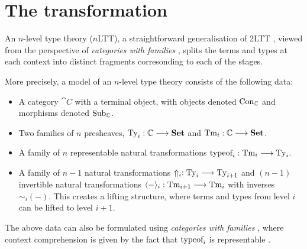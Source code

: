 \section{The transformation}\label{sec:prelim}

An $n$-level type theory ($n$LTT), a straightforward generalisation of 2LTT
\cite{Kovacs2022-vb}, viewed from the perspective of \emph{categories with
  families} \cite{Awodey2014-hh}, splits the terms and types at each context into
distinct fragments corresonding to each of the stages.

More precisely, a model of an $n$-level type theory consists of the following
data:
\begin{itemize}
  \item A category $\cat{C}$ with a terminal object, with objects denoted
        $\text{Con}_\mathbb{C}$ and morphisms denoted $\text{Sub}_\mathbb{C}$.
  \item Two families of $n$ presheaves, $\text{Ty}_i : \mathbb{C} \longrightarrow \mathbf{Set}$ and $\text{Tm}_i :
          \mathbb{C} \longrightarrow \mathbf{Set}$.
  \item A family of $n$ representable natural transformations $\text{typeof}_i : \text{Tm}_i \longrightarrow
          \text{Ty}_i$.
  \item A family of $n-1$ natural transformations $\Uparrow_i : \text{Ty}_i \longrightarrow \text{Ty}_{i + 1}$
        and $(n-1)$ invertible natural transformations $\langle-\rangle_i : \text{Tm}_{i + 1}
          \longrightarrow \text{Tm}_i$ with inverses $\sim_i(-)$. This creates a lifting structure, where
        terms and types from level $i$ can be lifted to level $i + 1$.
\end{itemize}

The above data can also be formulated using \emph{categories with families}
\cite{Castellan2019-sh}, where context comprehension is given by the fact that
$\text{typeof}_i$ is representable \cite{Uemura2019-cc}.

